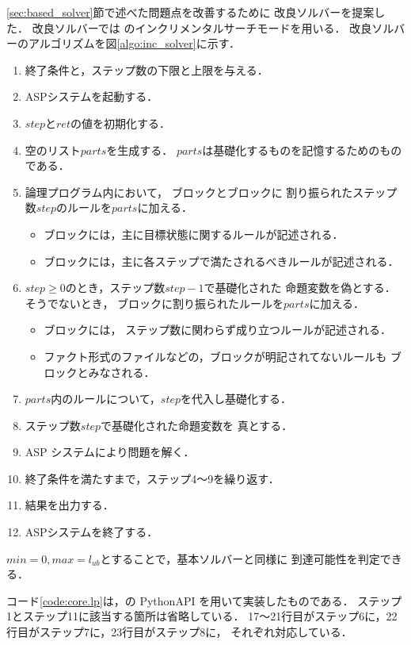 \ref{sec:based_solver}節で述べた問題点を改善するために
改良ソルバーを提案した．
改良ソルバーでは \clingo のインクリメンタルサーチモードを用いる．
改良ソルバーのアルゴリズムを図\ref{algo:inc_solver}に示す．
\begin{enumerate}
  \item 終了条件と，ステップ数の下限と上限を与える．
  \item ASPシステムを起動する．
  \item $step$と$ret$の値を初期化する．
  \item 空のリスト$parts$を生成する．
  $parts$は基礎化するものを記憶するためのものである．
  \item 論理プログラム内において，
  ブロックとブロックに
  割り振られたステップ数$step$のルールを$parts$に加える．

  \begin{itemize}
    \item {}ブロックには，主に目標状態に関するルールが記述される．
    \item {}ブロックには，主に各ステップで満たされるべきルールが記述される．
  \end{itemize}

  \item $step \ge 0$のとき，ステップ数$step-1$で基礎化された
  命題変数を偽とする．そうでないとき，
  ブロックに割り振られたルールを$parts$に加える．

  \begin{itemize}
    \item {}ブロックには，
    ステップ数に関わらず成り立つルールが記述される．
    \item ファクト形式のファイルなどの，ブロックが明記されてないルールも
    ブロックとみなされる．
  \end{itemize}

  \item $parts$内のルールについて，$step$を代入し基礎化する．
  \item ステップ数$step$で基礎化された命題変数を
  真とする．
  \item ASP システムにより問題を解く．
  \item 終了条件を満たすまで，ステップ4～9を繰り返す．
  \item 結果を出力する．
  \item ASPシステムを終了する．
\end{enumerate}
$min = 0, max = l_{ub}$とすることで，基本ソルバーと同様に
到達可能性を判定できる．

コード\ref{code:core.lp}は，\clingo の PythonAPI を用いて実装したものである．
ステップ1とステップ11に該当する箇所は省略している．
17～21行目がステップ6に，22行目がステップ7に，23行目がステップ8に，
それぞれ対応している．

